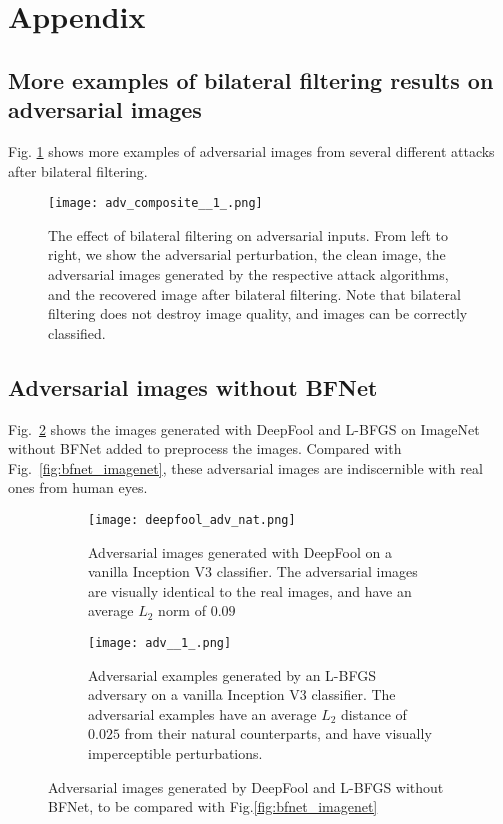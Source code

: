 \documentclass{article} %
\begin{document}



\newpage

\section{Appendix}
\subsection{More examples of bilateral filtering results on adversarial images}
Fig. \ref{fig:collection} shows more examples of adversarial images from several different attacks after bilateral filtering.
\begin{figure}[!ht]
\centering
\texttt{[image: adv\_composite\_\_1\_.png]}
\caption{The effect of bilateral filtering on adversarial inputs. From left to right, we show the adversarial perturbation, the clean image, the adversarial images generated by the respective attack algorithms, and the recovered image after bilateral filtering. Note that bilateral filtering does not destroy image quality, and images can be correctly classified. }
\label{fig:collection}
\end{figure}
\subsection{Adversarial images without BFNet}
Fig.~\ref{fig:nonbf_imagenet} shows the images generated with DeepFool and L-BFGS on ImageNet without BFNet added to preprocess the images. Compared with Fig.~\ref{fig:bfnet_imagenet}, these adversarial images are indiscernible with real ones from human eyes.
\begin{figure}[htb]
\begin{subfigure}{\textwidth}
  \centering
  \texttt{[image: deepfool\_adv\_nat.png]}
  \caption{\small Adversarial images generated with DeepFool on a vanilla Inception V3 classifier. The adversarial images are visually identical to the real images, and have an average $L_2$ norm of $0.09$}
\end{subfigure}
\vskip -0.05in
\begin{subfigure}{\textwidth}
  \centering
  \texttt{[image: adv\_\_1\_.png]}
  \caption{\small Adversarial examples generated by an L-BFGS adversary on a vanilla Inception V3 classifier. The adversarial examples have an average $L_2$ distance of $0.025$ from their natural counterparts, and have visually imperceptible perturbations. }
  \end{subfigure}
  \vskip -0.05in
  \caption{Adversarial images generated by DeepFool and L-BFGS without BFNet, to be compared with Fig.\ref{fig:bfnet_imagenet}}
  \label{fig:nonbf_imagenet}
\end{figure}
\end{document}
